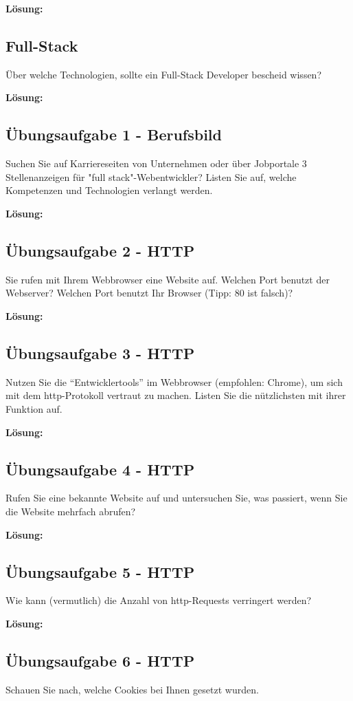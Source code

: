\documentclass[11pt,a4paper,DIV=12]{scrartcl}
\newcommand{\loesung}{\textbf{Lösung:}\\}
\begin{document}
\loesung

\subsection{Full-Stack}
Über welche Technologien, sollte ein Full-Stack Developer bescheid wissen?

\loesung

\subsection{Übungsaufgabe 1 - Berufsbild}
Suchen Sie auf Karriereseiten von Unternehmen oder über Jobportale 3 Stellenanzeigen für "full stack"-Webentwickler? Listen Sie auf, welche Kompetenzen und Technologien verlangt werden.

\loesung

\subsection{Übungsaufgabe 2 - HTTP}
Sie rufen mit Ihrem Webbrowser eine Website auf. Welchen Port benutzt der Webserver? Welchen Port benutzt Ihr Browser (Tipp: 80 ist falsch)?

\loesung

\subsection{Übungsaufgabe 3 - HTTP}
Nutzen Sie die \enquote{Entwicklertools} im Webbrowser (empfohlen: Chrome), um sich mit dem http-Protokoll vertraut zu machen. Listen Sie die nützlichsten mit ihrer Funktion auf.

\loesung

\subsection{Übungsaufgabe 4 - HTTP}
Rufen Sie eine bekannte Website auf und untersuchen Sie, was passiert, wenn Sie die Website mehrfach abrufen?

\loesung

\subsection{Übungsaufgabe 5 - HTTP}
Wie kann (vermutlich) die Anzahl von http-Requests verringert werden?

\loesung

\subsection{Übungsaufgabe 6 - HTTP}
Schauen Sie nach, welche Cookies bei Ihnen gesetzt wurden.
\end{document}
